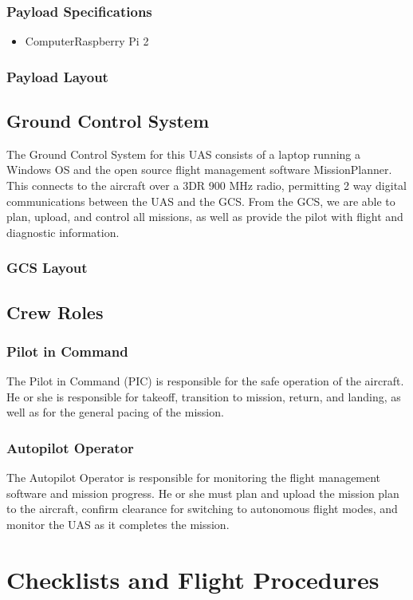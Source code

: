 \documentclass{report}
\begin{document}
		\subsection{Payload Specifications}
			\begin{itemize}
				\item Computer\hfill Raspberry Pi 2
			\end{itemize}
		\subsection{Payload Layout}
	\section{Ground Control System}
		The Ground Control System for this UAS consists of a laptop running a Windows OS and the open source flight management software MissionPlanner.  This connects to the aircraft over a 3DR 900 MHz radio, permitting 2 way digital communications between the UAS and the GCS.  From the GCS, we are able to plan, upload, and control all missions, as well as provide the pilot with flight and diagnostic information.
		\subsection{GCS Layout}
	\section{Crew Roles}
		\subsection{Pilot in Command}
			The Pilot in Command (PIC) is responsible for the safe operation of the aircraft.  He or she is responsible for takeoff, transition to mission, return, and landing, as well as for the general pacing of the mission.
		\subsection{Autopilot Operator}
			The Autopilot Operator is responsible for monitoring the flight management software and mission progress.  He or she must plan and upload the mission plan to the aircraft, confirm clearance for switching to autonomous flight modes, and monitor the UAS as it completes the mission.
\chapter{Checklists and Flight Procedures}
\end{document}
